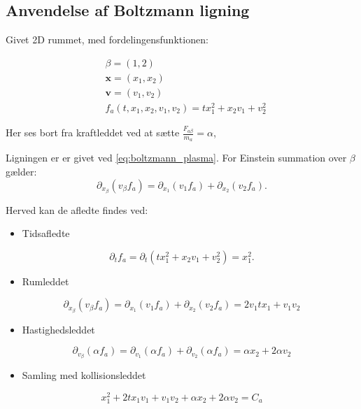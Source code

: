 \subsection{Anvendelse af Boltzmann ligning}\label{Braginskii example}
Givet 2D rummet, med fordelingensfunktionen:

\begin{align*}
    &\beta = (1, 2)\\
    &\mathbf{x} = (x_1, x_2)\\
    &\mathbf{v} = (v_1, v_2)\\
    &f_a(t, x_1, x_2, v_1, v_2) = t x_1^2 + x_2 v_1 + v_2^2
\end{align*}

Her ses bort fra kraftleddet ved at sætte $\frac{F_{a\beta}}{m_a} = \alpha$, 

Ligningen er er givet ved \ref{eq:boltzmann_plasma}. For Einstein summation over $\beta$ gælder:
\begin{equation*}
    \partial_{x_\beta}(v_\beta f_a) = \partial_{x_1}(v_1 f_a) + \partial_{x_2}(v_2 f_a).
\end{equation*}

Herved kan de afledte findes ved:
\begin{itemize}
    \item Tidsafledte
\end{itemize}
\begin{equation*}
    \partial_t f_a = \partial_t(t x_1^2 + x_2 v_1 + v_2^2) = x_1^2.
\end{equation*}

\begin{itemize}
    \item Rumleddet
\end{itemize}

\begin{equation*}
    \partial_{x_\beta}(v_\beta f_a) = \partial_{x_1}(v_1 f_a) + \partial_{x_2}(v_2 f_a) = 2v_1tx_1 + v_1v_2
\end{equation*}

\begin{itemize}
    \item Hastighedsleddet
\end{itemize}
\begin{equation*}
    \partial_{v_\beta}(\alpha f_a) = \partial_{v_1}(\alpha f_a) + \partial_{v_2}(\alpha f_a) = \alpha x_2 + 2\alpha v_2
\end{equation*}
\begin{itemize}
    \item Samling med kollisionsleddet
\end{itemize}
\begin{equation*}
    x_1^2 + 2t x_1 v_1 + v_1 v_2 + \alpha x_2 + 2\alpha v_2 = C_a
\end{equation*}
